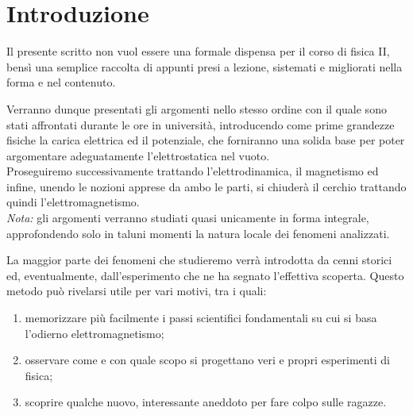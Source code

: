 \documentclass[a4paper,12pt,titlepage,openany]{book}
\theoremstyle{mydef}
\begin{document}
	\begin{frontespizio}
        \Preambolo{\usepackage{romannum}}
	\end{frontespizio}
    
    \frontmatter
    \pagestyle{plain}
    \cleardoublepage
    \tableofcontents
    \listoffigures
    \listoftables
    \cleardoublepage

    \chapter*{Introduzione} 
        Il presente scritto non vuol essere una formale dispensa per il corso di fisica II,
        bensì una semplice raccolta di appunti presi a lezione, sistemati e migliorati nella
        forma e nel contenuto.
        
        Verranno dunque presentati gli argomenti nello stesso ordine con il quale sono stati
        affrontati durante le ore in università, introducendo come prime grandezze fisiche la carica
        elettrica ed il potenziale, che forniranno una solida base per poter argomentare adeguatamente
        l'elettrostatica nel vuoto.\\
        Proseguiremo successivamente trattando l'elettrodinamica, il magnetismo ed infine, unendo le
        nozioni apprese da ambo le parti, si chiuderà il cerchio trattando quindi l'elettromagnetismo.\\
        \emph{Nota:} gli argomenti verranno studiati quasi unicamente in forma integrale, approfondendo solo
        in taluni momenti la natura locale dei fenomeni analizzati.
        
        \bigskip
        La maggior parte dei fenomeni che studieremo verrà introdotta da cenni storici ed, eventualmente,
        dall'esperimento che ne ha segnato l'effettiva scoperta. Questo metodo può rivelarsi utile per vari motivi,
        tra i quali:
        \begin{enumerate}
            \item memorizzare più facilmente i passi scientifici fondamentali su cui si basa l'odierno elettromagnetismo;
            \item osservare come e con quale scopo si progettano veri e propri esperimenti di fisica;
            \item scoprire qualche nuovo, interessante aneddoto per fare colpo sulle ragazze.
        \end{enumerate}
        
\end{document}
